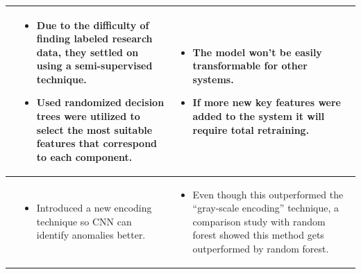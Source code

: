 \begin{longtable}{| p{25mm} | p{62mm} | p{62mm} |}
    \cite{kumarage2018anomaly} &
    \vspace{-8mm}
    \begin{itemize}[leftmargin=3mm,noitemsep,nolistsep] 
        \item Due to the difficulty of finding labeled research data, they settled on using a semi-supervised technique.
        \item Used randomized decision trees were utilized to select the most suitable features that correspond to each component.
        \vspace{-7mm}
    \end{itemize} &
    \vspace{-8mm}
    \begin{itemize}[leftmargin=3mm,noitemsep,nolistsep] 
        \item The model won't be easily transformable for other systems.
        \item If more new key features were added to the system it will require total retraining.
        \vspace{-7mm}
    \end{itemize} \\ \hline
    
    \cite{kim2018encoding} &
    \vspace{-8mm}
    \begin{itemize}[leftmargin=3mm,noitemsep,nolistsep] 
        \item Introduced a new encoding technique so CNN can identify anomalies better.
        \vspace{-7mm}
    \end{itemize} &
    \vspace{-8mm}
    \begin{itemize}[leftmargin=3mm,noitemsep,nolistsep] 
        \item Even though this outperformed the “gray-scale encoding” \citep{dasgupta2002anomaly} technique, a comparison study with random forest showed this method gets outperformed by random forest.
        \vspace{-7mm}
    \end{itemize} \\ \hline
    

\end{longtable}
